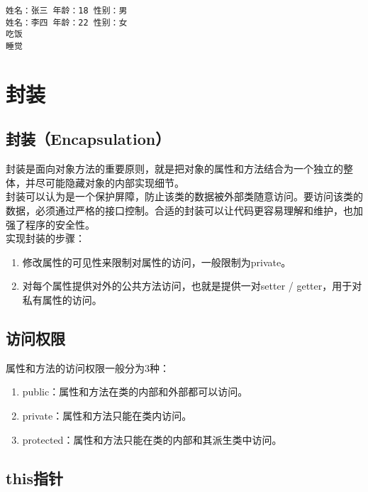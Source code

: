 \begin{tcolorbox}
	\begin{verbatim}
姓名：张三 年龄：18 性别：男
姓名：李四 年龄：22 性别：女
吃饭
睡觉
	\end{verbatim}
\end{tcolorbox}

\newpage

\section{封装}

\subsection{封装（Encapsulation）}

封装是面向对象方法的重要原则，就是把对象的属性和方法结合为一个独立的整体，并尽可能隐藏对象的内部实现细节。 \\

封装可以认为是一个保护屏障，防止该类的数据被外部类随意访问。要访问该类的数据，必须通过严格的接口控制。合适的封装可以让代码更容易理解和维护，也加强了程序的安全性。 \\

实现封装的步骤：

\begin{enumerate}
	\item 修改属性的可见性来限制对属性的访问，一般限制为private。
	\item 对每个属性提供对外的公共方法访问，也就是提供一对setter / getter，用于对私有属性的访问。
\end{enumerate}

\subsection{访问权限}

属性和方法的访问权限一般分为3种：

\begin{enumerate}
	\item public：属性和方法在类的内部和外部都可以访问。
	\item private：属性和方法只能在类内访问。
	\item protected：属性和方法只能在类的内部和其派生类中访问。
\end{enumerate}

\subsection{this指针}

